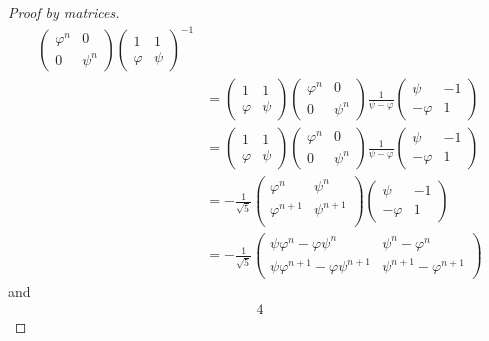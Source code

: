 \begin{proof}[Proof by matrices]
\begin{align*}
  \begin{pmatrix}
   \varphi^n & 0 \\
   0 & \psi^n
  \end{pmatrix}
  \begin{pmatrix}
   1 & 1 \\
   \varphi & \psi
  \end{pmatrix}^{-1} \\
  &=
  \begin{pmatrix}
   1 & 1 \\
   \varphi & \psi
  \end{pmatrix}
  \begin{pmatrix}
   \varphi^n & 0 \\
   0 & \psi^n
  \end{pmatrix}
  \frac 1 {\psi - \varphi}
  \begin{pmatrix}
   \psi & -1 \\
   -\varphi & 1
  \end{pmatrix} \\
  &=
  \begin{pmatrix}
   1 & 1 \\
   \varphi & \psi
  \end{pmatrix}
  \begin{pmatrix}
   \varphi^n & 0 \\
   0 & \psi^n
  \end{pmatrix}
  \frac 1 {\psi - \varphi}
  \begin{pmatrix}
   \psi & -1 \\
   -\varphi & 1
  \end{pmatrix} \\
  &=
  -\frac 1 {\sqrt 5}
  \begin{pmatrix}
   \varphi^n & \psi^n \\
   \varphi^{n + 1} & \psi^{n + 1} \\
  \end{pmatrix}
  \begin{pmatrix}
   \psi & -1 \\
   -\varphi & 1
  \end{pmatrix} \\
  &=
  -\frac 1 {\sqrt 5}
  \begin{pmatrix}
   \psi \varphi^n -\varphi \psi^n & \psi^n - \varphi^n \\
   \psi \varphi^{n + 1} - \varphi \psi^{n + 1} &
       \psi^{n + 1} - \varphi^{n + 1}
  \end{pmatrix}
 \end{align*}
 and
 \begin{alignat*}4

\end{alignat*}
\end{proof}
